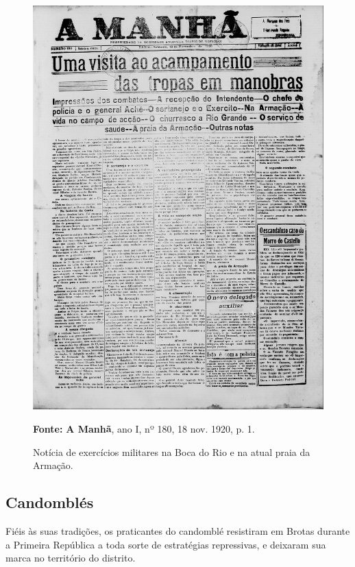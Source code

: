 \begin{figure}[!htp]
\centering
\caption{Notícia de exercícios militares na Boca do Rio e na atual praia da Armação.}
\includegraphics[width=1\textwidth]{4-cap3/complementos/imagens/19201118-exerciciosmilitaresbocadorio.jpg}{\par \footnotesize \textbf{Fonte:} \textbf{A Manhã}, ano I, nº 180, 18 nov. 1920, p. 1. }
\label{fig:exerciciosmilitaresbocadorio}
\end{figure}

\subsection{Candomblés}

Fiéis às suas tradições, os praticantes do candomblé resistiram em Brotas durante a Primeira República a toda sorte de estratégias repressivas, e deixaram sua marca no território do distrito. 

